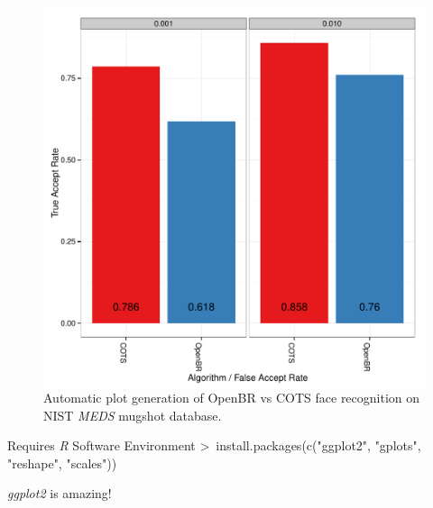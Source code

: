 \documentclass[12pt]{beamer}
\begin{document}
\begin{frame}
\begin{figure}
\begin{columns}
    \includegraphics[width=\textwidth]{img/MEDS/MEDS_BC}
\end{columns}
\caption{Automatic plot generation of OpenBR vs COTS face recognition on NIST \emph{MEDS} mugshot database.}
\end{figure}
\vspace{-18pt}
\pause
\begin{block}{Requires \emph{R} Software Environment}
\textgreater \ install.packages(c("ggplot2", "gplots", "reshape", "scales"))
\end{block}
\pause
\begin{center}
\emph{ggplot2} is amazing!
\end{center}
\end{frame}
\end{document}
